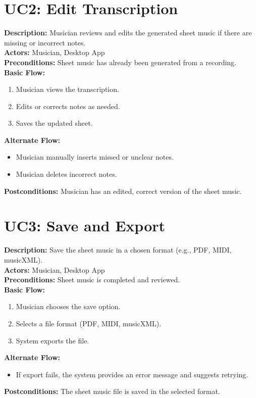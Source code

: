 \documentclass[12pt]{article}
\begin{document}
\section*{UC2: Edit Transcription}
\textbf{Description:} Musician reviews and edits the generated sheet music if there are missing or incorrect notes. \\
\textbf{Actors:} Musician, Desktop App \\
\textbf{Preconditions:} Sheet music has already been generated from a recording. \\
\textbf{Basic Flow:}
\begin{enumerate}
    \item Musician views the transcription.
    \item Edits or corrects notes as needed.
    \item Saves the updated sheet.
\end{enumerate}
\textbf{Alternate Flow:}
\begin{itemize}
    \item Musician manually inserts missed or unclear notes.
    \item Musician deletes incorrect notes.
\end{itemize}
\textbf{Postconditions:} Musician has an edited, correct version of the sheet music.

\section*{UC3: Save and Export}
\textbf{Description:} Save the sheet music in a chosen format (e.g., PDF, MIDI, musicXML). \\
\textbf{Actors:} Musician, Desktop App \\
\textbf{Preconditions:} Sheet music is completed and reviewed. \\
\textbf{Basic Flow:}
\begin{enumerate}
    \item Musician chooses the save option.
    \item Selects a file format (PDF, MIDI, musicXML).
    \item System exports the file.
\end{enumerate}
\textbf{Alternate Flow:}
\begin{itemize}
    \item If export fails, the system provides an error message and suggests retrying.
\end{itemize}
\textbf{Postconditions:} The sheet music file is saved in the selected format.
\end{document}
